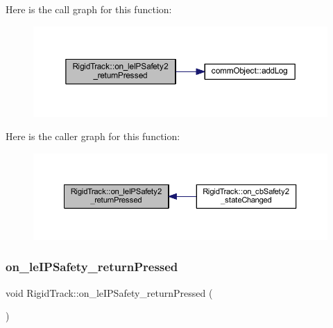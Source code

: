 Here is the call graph for this function\+:
\nopagebreak
\begin{figure}[H]
\begin{center}
\leavevmode
\includegraphics[width=350pt]{class_rigid_track_a555c536593d659b940de43cd2db8d6c1_cgraph}
\end{center}
\end{figure}
Here is the caller graph for this function\+:
\nopagebreak
\begin{figure}[H]
\begin{center}
\leavevmode
\includegraphics[width=350pt]{class_rigid_track_a555c536593d659b940de43cd2db8d6c1_icgraph}
\end{center}
\end{figure}
\mbox{\label{class_rigid_track_aa527ab3a2ddc7b31bf1063260efc9755}} 
\subsubsection{\texorpdfstring{on\+\_\+le\+I\+P\+Safety\+\_\+return\+Pressed}{on\_leIPSafety\_returnPressed}}
{\footnotesize\ttfamily void Rigid\+Track\+::on\+\_\+le\+I\+P\+Safety\+\_\+return\+Pressed (\begin{DoxyParamCaption}{ }\end{DoxyParamCaption})\hspace{0.3cm}{\ttfamily [slot]}}

